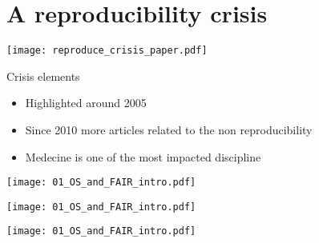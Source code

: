 \section{A reproducibility crisis}
\begin{frame}
\centering\texttt{[image: reproduce\_crisis\_paper.pdf]}
\end{frame}

\begin{frame}
\begin{block}{Crisis elements}
\begin{itemize}
\item Highlighted around 2005
\item Since 2010 more articles related to the non reproducibility
\item Medecine is one of the most impacted discipline
\end{itemize}
\end{block}
\end{frame}


\begin{frame}
\texttt{[image: 01\_OS\_and\_FAIR\_intro.pdf]}
\end{frame}

\begin{frame}
\texttt{[image: 01\_OS\_and\_FAIR\_intro.pdf]}
\end{frame}

\begin{frame}
\texttt{[image: 01\_OS\_and\_FAIR\_intro.pdf]}
\end{frame}

